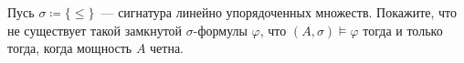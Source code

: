 Пусь $\sigma \coloneqq \{\le\}$~--- сигнатура линейно упорядоченных множеств. Покажите, что не существует
такой замкнутой $\sigma$-формулы $\varphi$, что $(A, \sigma) \models \varphi$ тогда и только тогда, когда
мощность $A$ четна.
